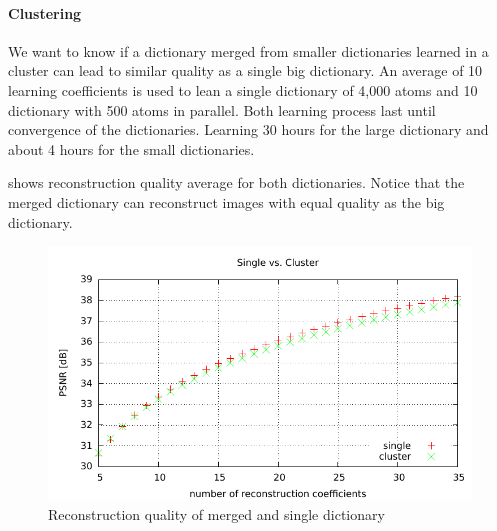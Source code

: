 


\paragraph{Clustering}
We want to know if a dictionary merged from smaller dictionaries learned in a
cluster can lead to similar quality as a single big dictionary. An average of 10
learning coefficients is used to lean a single dictionary of 4,000 atoms and 10
dictionary with 500 atoms in parallel. Both learning process last until
convergence of the dictionaries. Learning 30 hours for the large
dictionary and about 4 hours for the small dictionaries.  

 shows reconstruction quality average for both
dictionaries. Notice that the merged dictionary can reconstruct images with
equal quality as the big dictionary. 



\begin{figure}[H]
\centering
\includegraphics[width = 1.0\textwidth]{../tests/results/coeffsConvergInc.pdf}
\caption{Reconstruction quality of merged and single dictionary}
\label{fig:coeffsConvergInc}
\end{figure}


